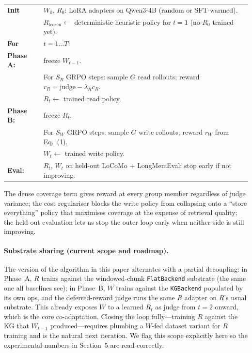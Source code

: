 \documentclass[11pt]{article}
\begin{document}
\begin{algorithm}[h]
\caption{Mempol co-training (alternating GRPO).}
\label{alg:cotrain}
\small
\begin{tabular}{ll}
\textbf{Init} & $W_0$, $R_0$: LoRA adapters on Qwen3-4B (random or SFT-warmed). \\
& $R_{\text{frozen}} \gets$ deterministic heuristic policy for $t = 1$ (no
  $R_0$ trained yet). \\
\textbf{For} & $t = 1 \ldots T$: \\
\quad\textbf{Phase A:} & freeze $W_{t-1}$. \\
& \quad For $S_R$ GRPO steps: sample $G$ read rollouts; reward
  $r_R = \mathrm{judge} - \lambda_R c_R$. \\
& \quad $R_t \gets$ trained read policy. \\
\quad\textbf{Phase B:} & freeze $R_t$. \\
& \quad For $S_W$ GRPO steps: sample $G$ write rollouts; reward $r_W$
  from Eq.~(1). \\
& \quad $W_t \gets$ trained write policy. \\
\quad\textbf{Eval:} & $R_t,\,W_t$ on held-out LoCoMo + LongMemEval;
                      stop early if not improving. \\
\end{tabular}
\end{algorithm}

The dense coverage term gives reward at every group member regardless of
judge variance; the cost regulariser blocks the write policy from
collapsing onto a ``store everything'' policy that maximises coverage at
the expense of retrieval quality; the held-out evaluation lets us stop
the outer loop early when neither side is still improving.

\paragraph{Substrate sharing (current scope and roadmap).} The version
of the algorithm in this paper alternates with a partial decoupling: in
Phase~A, $R$ trains against the windowed-chunk \texttt{FlatBackend}
substrate (the same one all baselines see); in Phase~B, $W$ trains
against the \texttt{KGBackend} populated by its own ops, and the
deferred-reward judge runs the same $R$ adapter on $R$'s usual
substrate. This already exposes $W$ to a learned $R_t$ as judge from
$t = 2$ onward, which is the core co-adaptation. Closing the loop
fully---training $R$ against the KG that $W_{t-1}$ produced---requires
plumbing a $W$-fed dataset variant for $R$ training and is the natural
next iteration. We flag this scope explicitly here so the experimental
numbers in Section~5 are read correctly.
\end{document}
